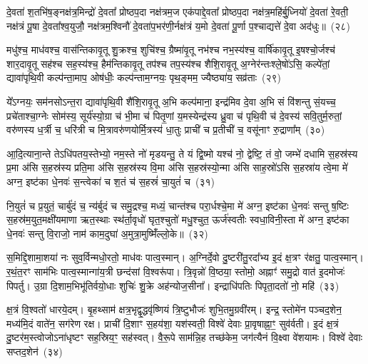 दे॒वता॑ श॒तभि॑ष॒ङ्नक्ष॑त्र॒मिन्द्रो॑ दे॒वता᳚ प्रोष्ठप॒दा नक्ष॑त्रम॒ज एक॑पाद्दे॒वता᳚ प्रोष्ठप॒दा नक्ष॑त्र॒महि॑र्बु॒ध्नियो॑ दे॒वता॑ रे॒वती॒ नक्ष॑त्रं पू॒षा दे॒वता᳚श्व॒युजौ॒ नक्ष॑त्रम॒श्विनौ॑ दे॒वता॑प॒भर॑णी॒र्नक्ष॑त्रं य॒मो दे॒वता॑ पू॒र्णा प॒श्चाद्यत्ते॑ दे॒वा अद॑धुः॥~(२८)

{\anuvakamend[{फल्गु॑नी॒ नक्ष॑त्रं॒ वस॑व॒स्त्रय॑स्त्रिꣳशच्च}]}%

मधु॑श्च॒ माध॑वश्च॒ वास॑न्तिकावृ॒तू शु॒क्रश्च॒ शुचि॑श्च॒ ग्रैष्मा॑वृ॒तू नभ॑श्च नभ॒स्य॑श्च॒ वार्\mbox{}षि॑कावृ॒तू इ॒षश्चो॒र्जश्च॑ शार॒दावृ॒तू सह॑श्च सह॒स्य॑श्च॒ हैम॑न्तिकावृ॒तू तप॑श्च तप॒स्य॑श्च शैशि॒रावृ॒तू अ॒ग्नेर॑न्तःश्ले॒षो॑\-ऽसि॒ कल्पे॑तां॒ द्यावा॑पृथि॒वी कल्प॑न्ता॒माप॒ ओष॑धीः॒ कल्प॑न्ताम॒ग्नयः॒ पृथ॒ङ्मम॒ ज्यैष्ठ्या॑य॒ सव्र॑ताः~(२९)

ये᳚\-ऽग्नयः॒ सम॑नसो\-ऽन्त॒रा द्यावा॑पृथि॒वी शै॑शि॒रावृ॒तू अ॒भि कल्प॑माना॒ इन्द्र॑मिव दे॒वा अ॒भि सं वि॑शन्तु सं॒यच्च॒ प्रचे॑ताश्चा॒ग्नेः सोम॑स्य॒ सूर्य॑स्यो॒ग्रा च॑ भी॒मा च॑ पितृ॒णां य॒मस्येन्द्र॑स्य ध्रु॒वा च॑ पृथि॒वी च॑ दे॒वस्य॑ सवि॒तुर्म॒रुतां॒ वरु॑णस्य ध॒र्त्री च॒ धरि॑त्री च मि॒त्रावरु॑णयोर्मि॒त्रस्य॑ धा॒तुः प्राची॑ च प्र॒तीची॑ च॒ वसू॑नाꣳ रु॒द्राणा᳚म्~(३०)

आ॒दि॒त्याना॒न्ते ते\-ऽधि॑पतय॒स्तेभ्यो॒ नम॒स्ते नो॑ मृडयन्तु॒ ते यं द्वि॒ष्मो यश्च॑ नो॒ द्वेष्टि॒ तं वो॒ जम्भे॑ दधामि स॒हस्र॑स्य प्र॒मा अ॑सि स॒हस्र॑स्य प्रति॒मा अ॑सि स॒हस्र॑स्य वि॒मा अ॑सि स॒हस्र॑स्यो॒न्मा अ॑सि साह॒स्रो॑\-ऽसि स॒हस्रा॑य त्वे॒मा मे॑ अग्न॒ इष्ट॑का धे॒नवः॑ स॒न्त्वेका॑ च श॒तं च॑ स॒हस्रं॑ चा॒युतं॑ च~(३१)

नि॒युतं॑ च प्र॒युतं॒ चार्बु॑दं च॒ न्य॑र्बुदं च समु॒द्रश्च॒ मध्यं॒ चान्त॑श्च परा॒र्धश्चे॒मा मे॑ अग्न॒ इष्ट॑का धे॒नवः॑ सन्तु ष॒ष्टिः स॒हस्र॑म॒युत॒मक्षी॑यमाणा ऋत॒स्थाः स्थ॑र्ता॒वृधो॑ घृत॒श्चुतो॑ मधु॒श्चुत॒ ऊर्ज॑स्वतीः स्वधा॒विनी॒स्ता मे॑ अग्न॒ इष्ट॑का धे॒नवः॑ सन्तु वि॒राजो॒ नाम॑ काम॒दुघा॑ अ॒मुत्रा॒मुष्मिँ॑ल्लो॒के॥~(३२)

{\anuvakamend[{सव्र॑ता रु॒द्राणा॑म॒युतं॑ च॒ पञ्च॑चत्वारिꣳशच्च}]}%

स॒मिद्दि॒शामा॒शया॑ नः सुव॒र्विन्मधो॒रतो॒ माध॑वः पात्व॒स्मान्। अ॒ग्निर्दे॒वो दु॒ष्टरी॑तु॒रदा᳚भ्य इ॒दं क्ष॒त्रꣳ र॑क्षतु॒ पात्व॒स्मान्। र॒थं॒त॒रꣳ साम॑भिः पात्व॒स्मान्गा॑य॒त्री छन्द॑सां वि॒श्वरू॑पा। त्रि॒वृन्नो॑ वि॒ष्ठया॒ स्तोमो॒ अह्नाꣳ॑ समु॒द्रो वात॑ इ॒दमोजः॑ पिपर्तु। उ॒ग्रा दि॒शाम॒भिभू॑तिर्वयो॒धाः शुचिः॑ शु॒क्रे अह॑न्योज॒सीना᳚। इन्द्राधि॑पतिः पिपृता॒दतो॑ नो॒ महि॑~(३३)

क्ष॒त्रं वि॒श्वतो॑ धारये॒दम्। बृ॒हथ्साम॑ क्षत्र॒भृद्वृ॒द्धवृ॑ष्णियं त्रि॒ष्टुभौजः॑ शुभि॒तमु॒ग्रवी॑रम्। इन्द्र॒ स्तोमे॑न पञ्चद॒शेन॒ मध्य॑मि॒दं वाते॑न॒ सग॑रेण रक्ष। प्राची॑ दि॒शाꣳ स॒हय॑शा॒ यश॑स्वती॒ विश्वे॑ देवाः प्रा॒वृषाह्ना॒ꣳ॒ सुव॑र्वती। इ॒दं क्ष॒त्रं दु॒ष्टर॑म॒स्त्वोजो\-ऽना॑धृष्टꣳ सह॒स्रिय॒ꣳ॒ सह॑स्वत्। वै॒रू॒पे साम॑न्नि॒ह तच्छ॑केम॒ जग॑त्यैनं वि॒क्ष्वा वे॑शयामः। विश्वे॑ देवाः सप्तद॒शेन॑~(३४)

